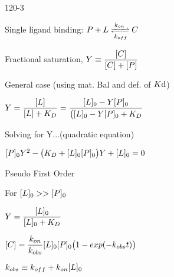 \begin{mitframe}{120-3}
 \begin{listone}
	\item Single ligand binding: $\p+\length\xrightleftharpoons[\thermcond_{off}]{\thermcond_{on}}\conc$
    	\begin{listtwo}
        	\item Fractional saturation, $Y\equiv\dfrac{[\conc]}{[\conc]+[\p]}$
            \item General case (using mat. Bal and def. of $\dilfac\mathrm{d}$)
            \begin{listthree}
            	\item $Y=\dfrac{[\length]}{[\length]+\dilfac_{\elecdisplace}}=\dfrac{[\length]_{\init}-Y[\p]_{\init}}{\big([\length]_{\init}-Y[\p]_{\init}+\dilfac_{\elecdisplace}}$
                \item Solving for Y...(quadratic equation)
                \item $[\p]_{\init}Y^2-\big(\dilfac_{\elecdisplace}+[\length]_{\init}[\p]_{\init}\big)Y+[\length]_{\init}=0$
            \end{listthree}
        	\item Pseudo First Order
            	\begin{listthree}
                	\item For $[\length]_{\init}>>[\p]_{\init}$
                    \item $Y=\dfrac{[\length]_{\init}}{[\length]_{\init}+\dilfac_{\elecdisplace}}$
                    \item$ [\conc]=\dfrac{\thermcond_{on}}{\thermcond_{obs}}[\length]_{\init}[\p]_{\init}\big(1-exp(-\thermcond_{obs}\timet)\big)$
                    	\begin{listfour}
                        \item $\thermcond_{obs}\equiv\thermcond_{off}+\thermcond_{on}[\length]_{\init}$
                        \end{listfour}
                \end{listthree}
        \end{listtwo}
\end{listone}       
\end{mitframe}